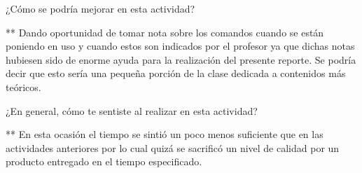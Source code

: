 \documentclass{article} %
\begin{document}
\vspace{0.5 cm}

¿Cómo se podría mejorar en esta actividad?
\vspace{0.5 cm}

** Dando oportunidad de tomar nota sobre los comandos cuando se están poniendo en uso y cuando estos son indicados por el profesor ya que dichas notas hubiesen sido de enorme ayuda para la realización del presente reporte. Se podría decir que esto sería una pequeña porción de la clase dedicada a contenidos más teóricos.

\vspace{0.5 cm}

¿En general, cómo te sentiste al realizar en esta actividad? 
\vspace{0.5 cm}

** En esta ocasión el tiempo se sintió un poco menos suficiente que en las actividades anteriores por lo cual quizá se sacrificó un nivel de calidad por un producto entregado en el tiempo especificado. 

\vspace{0.5 cm}


 
\end{document}
